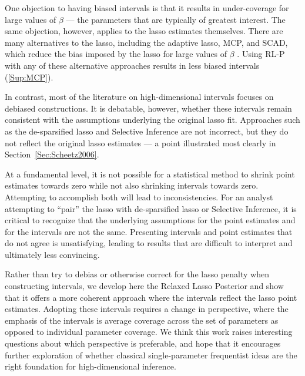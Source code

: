 One objection to having biased intervals is that it results in under-coverage for large values of $\beta$ --- the parameters that are typically of greatest interest. The same objection, however, applies to the lasso estimates themselves. There are many alternatives to the lasso, including the adaptive lasso, MCP, and SCAD, which reduce the bias imposed by the lasso for large values of $\beta$ \citep{Zou2006, Zhang2010, Fan2001}. Using RL-P with any of these alternative approaches results in less biased intervals (\ref{Sup:MCP}).

In contrast, most of the literature on high-dimensional intervals focuses on debiased constructions. It is debatable, however, whether these intervals remain consistent with the assumptions underlying the original lasso fit. Approaches such as the de-sparsified lasso and Selective Inference are not incorrect, but they do not reflect the original lasso estimates --- a point illustrated most clearly in Section~\ref{Sec:Scheetz2006}.

At a fundamental level, it is not possible for a statistical method to shrink point estimates towards zero while not also shrinking intervals towards zero. Attempting to accomplish both will lead to inconsistencies. For an analyst attempting to ``pair'' the lasso with de-sparsified lasso or Selective Inference, it is critical to recognize that the underlying assumptions for the point estimates and for the intervals are not the same. Presenting intervals and point estimates that do not agree is unsatisfying, leading to results that are difficult to interpret and ultimately less convincing.

Rather than try to debias or otherwise correct for the lasso penalty when constructing intervals, we develop here the Relaxed Lasso Posterior and show that it offers a more coherent approach where the intervals reflect the lasso point estimates. Adopting these intervals requires a change in perspective, where the emphasis of the intervals is average coverage across the set of parameters as opposed to individual parameter coverage. We think this work raises interesting questions about which perspective is preferable, and hope that it encourages further exploration of whether classical single-parameter frequentist ideas are the right foundation for high-dimensional inference.